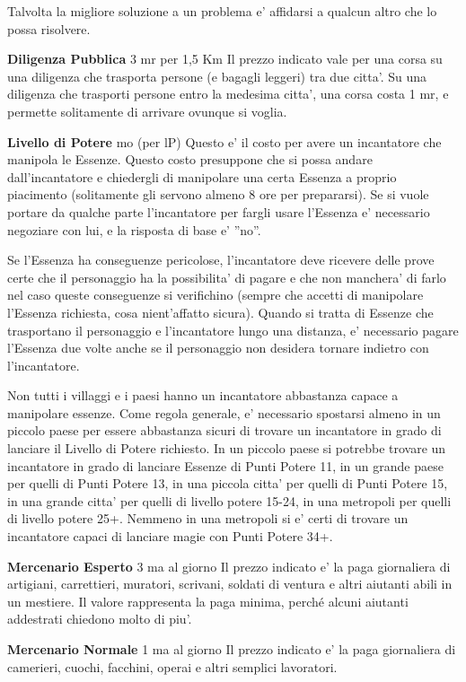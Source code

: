 \documentclass[a4paper,11pt,twoside,openany]{book}
\begin{document}
{		Talvolta la migliore soluzione a un problema e' affidarsi a qualcun altro che lo possa risolvere.
		
		\textbf{Diligenza Pubblica} 3 mr per 1,5 Km Il prezzo indicato vale per una corsa su una diligenza che trasporta persone (e bagagli leggeri) tra due citta'. Su una diligenza che trasporti persone entro la medesima citta', una corsa costa 1 mr, e permette solitamente di arrivare ovunque si voglia.
		
		\textbf{Livello di Potere}  mo (per lP) Questo e' il costo per avere un incantatore che manipola le Essenze. Questo costo presuppone che si possa andare dall'incantatore e chiedergli di manipolare una certa Essenza a proprio piacimento (solitamente gli servono almeno 8 ore per prepararsi). Se si vuole portare da qualche parte l'incantatore per fargli usare l'Essenza e' necessario negoziare con lui, e la risposta di base e' ''no''.
		
		Se l'Essenza ha conseguenze pericolose, l'incantatore deve ricevere delle prove certe che il personaggio ha la possibilita' di pagare e che non manchera' di farlo nel caso queste conseguenze si verifichino (sempre che accetti di manipolare l'Essenza richiesta, cosa nient'affatto sicura). Quando si tratta di Essenze che trasportano il personaggio e l'incantatore lungo una distanza, e' necessario pagare l'Essenza due volte anche se il personaggio non desidera tornare indietro con l'incantatore.
		
		Non tutti i villaggi e i paesi hanno un incantatore abbastanza capace a manipolare essenze. Come regola generale, e' necessario spostarsi almeno in un piccolo paese per essere abbastanza sicuri di trovare un incantatore in grado di lanciare il Livello di Potere richiesto. In un piccolo paese si potrebbe trovare un incantatore in grado di lanciare Essenze di Punti Potere 11, in un grande paese per quelli di Punti Potere 13, in una piccola citta' per quelli di Punti Potere 15, in una grande citta' per quelli di livello potere 15-24, in una metropoli per quelli di livello potere 25+. Nemmeno in una metropoli si e' certi di trovare un incantatore capaci di lanciare magie con Punti Potere 34+. 
		
		\textbf{Mercenario Esperto} 3 ma al giorno Il prezzo indicato e' la paga giornaliera di artigiani, carrettieri, muratori, scrivani, soldati di ventura e altri aiutanti abili in un mestiere. Il valore rappresenta la paga minima, perché alcuni aiutanti addestrati chiedono molto di piu'.
		
		\textbf{Mercenario Normale} 1 ma al giorno Il prezzo indicato e' la paga giornaliera di camerieri, cuochi, facchini, operai e altri semplici lavoratori.
		
}
\end{document}
